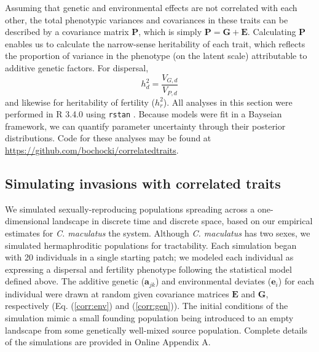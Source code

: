 \documentclass[11pt]{article}
\newcommand{\tom}[1]{{\textit{\color{WildStrawberry}{[#1]}}}}
\def\code#1{\texttt{#1}}
\begin{document}
Assuming that genetic and environmental effects are not correlated with each other, the total phenotypic variances and covariances in these traits can be described by a covariance matrix $\bm{P}$, which is simply $\bm{P} = \bm{G} + \bm{E}$.
Calculating $\bm{P}$ enables us to calculate the narrow-sense heritability of each trait, which reflects the proportion of variance in the phenotype (on the latent scale) attributable to additive genetic factors.
For dispersal,
%
\begin{equation}\label{corr:heritability}
  h^{2}_d = \frac{V_{G,d}}{V_{P,d}}
\end{equation}
%
and likewise for heritability of fertility ($h^{2}_r$).
All analyses in this section were performed in R 3.4.0 \citep{r_core_team_r:_2015} using \code{rstan} \citep{stan_development_team_rstan:_2015}.
Because models were fit in a Bayseian framework, we can quantify parameter uncertainty through their posterior distributions.
Code for these analyses may be found at \url{https://github.com/bochocki/correlatedtraits}.

\subsection*{Simulating invasions with correlated traits}
We simulated sexually-reproducing populations spreading across a one-dimensional landscape in discrete time and discrete space, based on our empirical estimates for \textit{C. maculatus} the system.
Although \textit{C. maculatus} has two sexes, we simulated hermaphroditic populations for tractability.
Each simulation began with 20 individuals in a single starting patch; we modeled each individual as expressing a dispersal and fertility phenotype following the statistical model defined above.
The additive genetic ($\bm{a}_{jk}$) and environmental deviates ($\bm{e}_i$) for each individual were drawn at random given covariance matrices $\bm{E}$ and $\bm{G}$, respectively (Eq. (\ref{corr:env}) and (\ref{corr:gen})).
The initial conditions of the simulation mimic a small founding population being introduced to an empty landscape from some genetically well-mixed source population.
Complete details of the simulations are provided in Online Appendix A.
\end{document}
